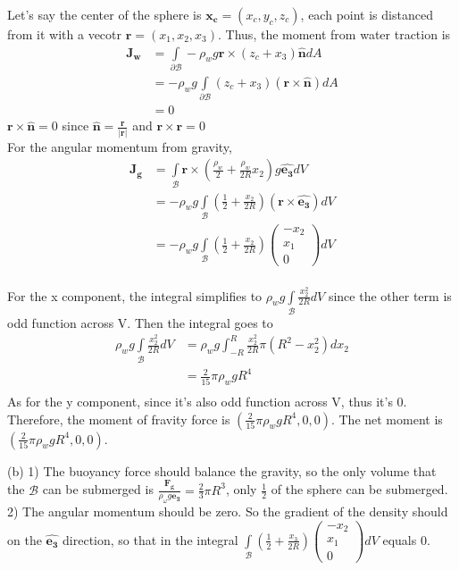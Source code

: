 Let's say the center of the sphere is $\bm{x_c}=(x_c,y_c,z_c)$, each point is distanced from it with a vecotr $\bm{r}=(x_1,x_2,x_3)$. Thus, the moment from water traction is 
\begin{align*}
     \bm{J_w} &= \int\limits_{\partial \mathcal{B}} -\rho_w g  \bm{r} \times (z_c+x_3) \hat{\bm{n}}dA \\
     &=  -\rho_w g\int\limits_{\partial \mathcal{B}}(z_c+x_3)(\bm{r}\times\hat{\bm{n}})dA  \\
     &= 0
\end{align*}
$\bm{r}\times\hat{\bm{n}}=0$ since $\hat{\bm{n}}=\frac{\bm{r}}{|\bm{r}|}$ and $\bm{r}\times\bm{r}=0$ \\
For the angular momentum from gravity,
\begin{align*}
    \bm{J_g}&= 
    \int\limits_{\mathcal{B}} \bm{r} \times (\frac{\rho_w}2 +\frac{\rho_w}{2R} x_2)g\hat{\bm{e_3}}dV  \\
    &=-\rho_w g \int\limits_{\mathcal{B}}(\frac12 +\frac{x_2}{2R})( \bm{r} \times \hat{\bm{e_3}})dV\\
    &=-\rho_w g \int\limits_{\mathcal{B}}(\frac12 +\frac{x_2}{2R})
    \begin{pmatrix}
        -x_2 \\x_1 \\0
    \end{pmatrix}dV
\end{align*} \\
For the x component, the integral simplifies to $\rho_w g \int\limits_{\mathcal{B}}\frac{x_2^2}{2R}dV$ since the other term is odd function across V. Then the integral goes to
\begin{align*}
    \rho_w g \int\limits_{\mathcal{B}}\frac{x_2^2}{2R}dV
    &=\rho_w g \int^{R}_{-R}\frac{x_2^2}{2R}\pi(R^2-x_2^2)dx_2\\
    &=\frac2{15}\pi\rho_w g R^4 \\
    \end{align*}
As for the y component, since it's also odd function across V, thus it's 0. \\
Therefore, the moment of fravity force is $(\frac2{15}\pi\rho_w g R^4,0,0)$. The net moment is $(\frac2{15}\pi\rho_w g R^4,0,0)$.

\medskip
(b)
1) The buoyancy force should balance the gravity, so the only volume that the ${\mathcal{B}}$ can be submerged is $ \frac{\bm{F_g}}{\rho_{\omega}g\bm{e_3}}= \frac23 \pi R^3$, only $\frac12$ of the sphere can be submerged.\\
2) The angular momentum should be zero. So the gradient of the density should on the $\hat{\bm{e_3}}$ direction, so that in the integral $\int\limits_{\mathcal{B}}(\frac12 +\frac{x_3}{2R})
    \begin{pmatrix}
        -x_2 \\x_1 \\0
    \end{pmatrix}dV$ equals 0.



